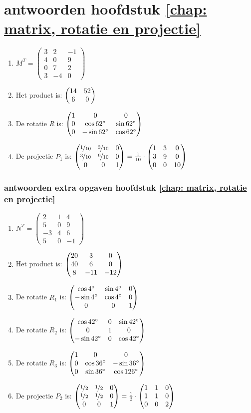 \section{antwoorden  hoofdstuk \ref{chap: matrix, rotatie en projectie}}
\begin{enumerate}
	\item  
	$ M^{T} =	\begin{pmatrix}
	3 & 2 & -1\\
	4&0&9\\
	0&7&2\\
	3&-4&0 
	\end{pmatrix} $
	\item
	Het product is:  $ \begin{pmatrix} 14&52 \\ 6&0 \end{pmatrix}  $
	\item
	De rotatie \textit{R} is:  
	$ \begin{pmatrix} 1&0&0 \\ 0&\cos  62 \degree  & \sin 62 \degree \\ 0& -\sin 62 \degree & \cos 62 \degree \end{pmatrix}  $
	\item
	De projectie \textit{$P_1$} is:  
	$ \begin{pmatrix} \nicefrac{1}{10}&\nicefrac{3}{10}&0 \\ \nicefrac{3}{10}&\nicefrac{9}{10}  & 0 \\ 0& 0 & 1 \end{pmatrix}  
	= \frac{1}{10} \cdot\begin{pmatrix} 1&3&0 \\ 3&9  & 0 \\ 0& 0 & 10 \end{pmatrix} $    
	
\end{enumerate}

\subsubsection{antwoorden extra opgaven hoofdstuk \ref{chap: matrix, rotatie en projectie}}
\begin{enumerate}
	\item
	$ N^{T} =	\begin{pmatrix}
	2 & 1 & 4\\
	5&0&9\\
	-3&4&6\\
	5&0&-1 
	\end{pmatrix} $
	\item
	Het product is:  
	$ \begin{pmatrix} 20&3&0 \\ 40&6&0 \\ 8&-11&-12 \end{pmatrix} $
	\item    De rotatie   \textit{$ R_1  $}  is:  
	$ \begin{pmatrix} \cos  4 \degree  & \sin 4 \degree &0 \\  -\sin 4 \degree & \cos 4 \degree&0 \\ 0&0&1 \end{pmatrix} $
	\item De rotatie   \textit{$ R_2  $}  is:  
	$ \begin{pmatrix} \cos  42 \degree  & 0& \sin 42 \degree  \\ 0&1&0 \\  -\sin 42\degree &  0 &\cos 42 \degree \end{pmatrix} 
	$
	\item     De rotatie \textit{$ R_3  $} is:  
	$ \begin{pmatrix} 1&0&0 \\ 0&\cos  36 \degree  & -\sin 36 \degree \\ 0& \sin 36 \degree & \cos 126 \degree \end{pmatrix} $ \\
	\item   De projectie \textit{ $ P_2 $ } is:  
	$ \begin{pmatrix} \nicefrac{1}{2}&\nicefrac{1}{2}&0 \\ \nicefrac{1}{2}&\nicefrac{1}{2}  & 0 \\ 0& 0 & 1 \end{pmatrix}  
	= \frac{1}{2} \cdot\begin{pmatrix} 1&1&0 \\ 1&1  & 0 \\ 0& 0 & 2 \end{pmatrix} $    
	
\end{enumerate}


